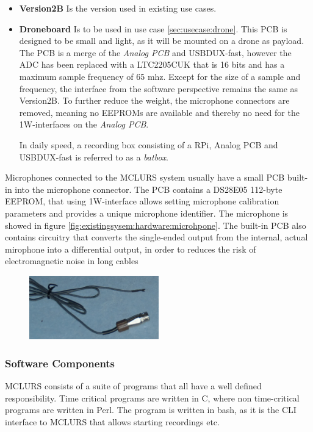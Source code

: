 \begin{itemize}
	\item \textbf{Version2B} Is the version used in existing use cases. 

	\item \textbf{Droneboard} Is to be used in use case \ref{sec:usecase:drone}. This PCB is designed to be small and light, as it will be mounted on a drone as payload. The PCB is a merge of the \textit{Analog PCB} and USBDUX-fast, however the ADC has been replaced with a LTC2205CUK\citep{ADC:LTC2205} that is 16 bits and has a maximum sample frequency of 65 mhz. Except for the size of a sample and frequency, the interface from the software perspective remains the same as Version2B. To further reduce the weight, the microphone connectors are removed, meaning no EEPROMs are available and thereby no need for the 1W-interfaces on the \textit{Analog PCB}.

In daily speed, a recording box consisting of a RPi, Analog PCB and USBDUX-fast is referred to as a \textit{batbox}.

\end{itemize}
Microphones connected to the MCLURS system usually have a small PCB built-in into the microphone connector. The PCB contains a DS28E05\citep{EEPROM:DS28E05} 112-byte EEPROM, that using 1W-interface allows setting microphone calibration parameters and provides a unique microphone identifier. The microphone is showed in figure \ref{fig:existingsysem:hardware:microhpone}. The built-in PCB also contains circuitry that converts the single-ended output from the internal, actual mirophone into a differential output, in order to reduces the risk of electromagnetic noise in long cables

\begin{figure}[h!]
	\centering
	\includegraphics[width=0.5\textwidth]{figures/mclurs_microphone}
\end{figure}
\subsubsection{Software Components} \label{sec:existingsystem:software}
MCLURS consists of a suite of programs that all have a well defined responsibility. Time critical programs are written in C, where non time-critical programs are written in Perl.
The  program is written in bash, as it is the CLI interface to MCLURS that allows starting recordings etc.

